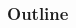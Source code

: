 \documentclass[english,xcolor=pdftex,dvipsnames,aspectratio=169]{beamer}
\begin{document}
\begin{frame}[plain] %
  \titlepage
\end{frame}

\begin{frame}
  \frametitle{Outline}
  \begin{columns}[t]
    \begin{column}{.5\textwidth}
      \tableofcontents[sections={1-8}]
    \end{column}
    \begin{column}{.5\textwidth}
      \tableofcontents[sections={9-16}]
    \end{column}
  \end{columns}
\end{frame}












\end{document}

